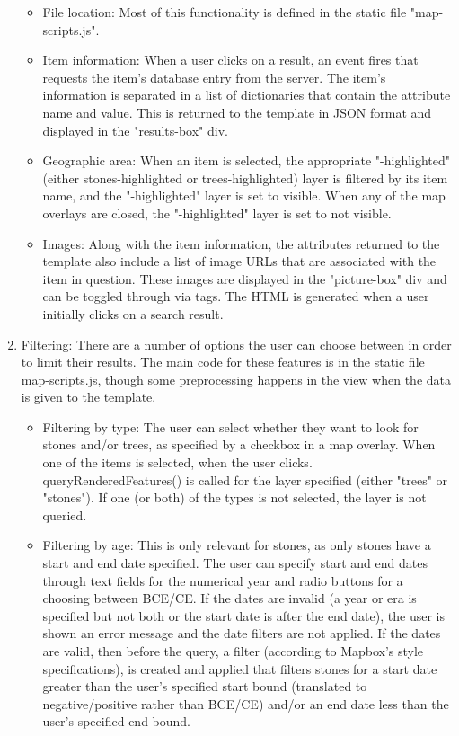 \documentclass[]{article}
\begin{document}
\begin{enumerate}
		\begin{itemize}
			\item File location: Most of this functionality is defined in the static file "map-scripts.js". 
			\item Item information: When a user clicks on a result, an event fires that requests the item's database entry from the server. The item's information is separated in a list of dictionaries that contain the attribute name and value. This is returned to the template in JSON format and displayed in the "results-box" div. 
			\item Geographic area: When an item is selected, the appropriate "-highlighted" (either stones-highlighted or trees-highlighted) layer is filtered by its item name, and the "-highlighted" layer is set to visible. When any of the map overlays are closed, the "-highlighted" layer is set to not visible. 
			\item Images: Along with the item information, the attributes returned to the template also include a list of image URLs that are associated with the item in question. These images are displayed in the "picture-box" div and can be toggled through via tags. The HTML is generated when a user initially clicks on a search result. 
		\end{itemize}
	\item Filtering: There are a number of options the user can choose between in order to limit their results. The main code for these features is in the static file map-scripts.js, though some preprocessing happens in the view when the data is given to the template. 
		\begin{itemize}
			\item Filtering by type: The user can select whether they want to look for stones and/or trees, as specified by a checkbox in a map overlay. When one of the items is selected, when the user clicks. queryRenderedFeatures() is called for the layer specified (either "trees" or "stones"). If one (or both) of the types is not selected, the layer is not queried.  
			\item Filtering by age: This is only relevant for stones, as only stones have a start and end date specified. The user can specify start and end dates through text fields for the numerical year and radio buttons for a choosing between BCE/CE. If the dates are invalid (a year or era is specified but not both or the start date is after the end date), the user is shown an error message and the date filters are not applied. If the dates are valid, then before the query, a filter (according to Mapbox's style specifications), is created and applied that filters stones for a start date greater than the user's specified start bound (translated to negative/positive rather than BCE/CE) and/or an end date less than the user's specified end bound. 
		\end{itemize} 
\end{enumerate} 
\end{document}
